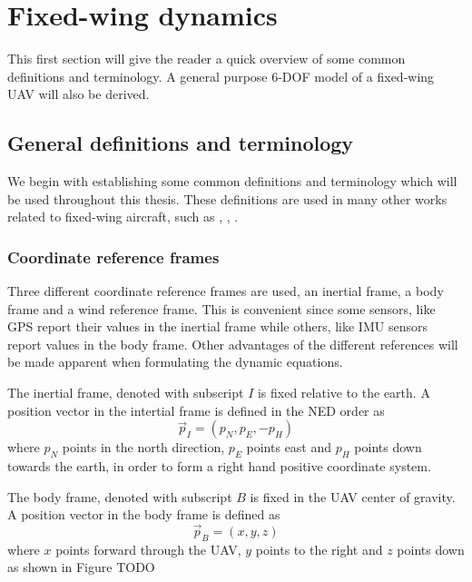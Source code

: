 \section{Fixed-wing dynamics}
This first section will give the reader a quick overview of some common definitions and terminology. 
A general purpose 6-DOF model of a fixed-wing UAV will also be derived. 
\subsection{General definitions and terminology}
We begin with establishing some common definitions and
 terminology which will be used throughout this thesis. These definitions are 
 used in many other works related to fixed-wing aircraft, such as \cite{uav_dynamics_wind}, \cite{uav_dynamics_modeling}, 
\cite{fighter_aircraft_mpc}. 

\subsubsection{Coordinate reference frames}
Three different coordinate reference frames are used, an inertial frame, a body frame and a wind reference frame.
This is convenient since some sensors, like GPS report their values in the inertial frame
 while others, like IMU sensors report values in the body frame. Other advantages of the different references
will be made apparent when formulating the dynamic equations.

\begin{definition}
    The inertial frame, denoted with subscript $I$ is fixed relative to the earth.
    A position vector in the intertial frame is defined in the NED order as
    \begin{equation}
        \vec{p}_I = (p_N, p_E, -p_H)
    \end{equation}
    where $p_N$ points in the north direction, $p_E$ points east and $p_H$ points down towards the earth,
    in order to form a right hand positive coordinate system.
\end{definition}

\begin{definition}
    The body frame, denoted with subscript $B$ is fixed in the UAV center of gravity.
    A position vector in the body frame is defined as
    \begin{equation}
        \vec{p}_B = (x, y, z)
    \end{equation}
    where $x$ points forward through the UAV, $y$ points to the right and $z$ points down as shown in Figure TODO
\end{definition}

